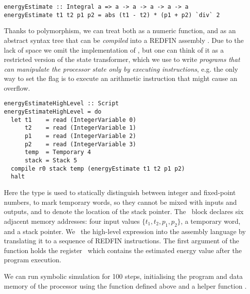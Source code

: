
\vspace{1mm}
\begin{verbatim}
energyEstimate :: Integral a => a -> a -> a -> a -> a
energyEstimate t1 t2 p1 p2 = abs (t1 - t2) * (p1 + p2) `div` 2
\end{verbatim}
\vspace{1mm}

\noindent
Thanks to polymorphism, we can treat  both as a numeric
function, and as an abstract syntax tree that can be \emph{compiled} into a
REDFIN assembly . Due to the lack of space we omit the implementation
of , but one can think of it as a restricted version
of the  state transformer, which we use to write \emph{programs that
can manipulate the processor state only by executing instructions}, e.g. the
only way to set the  flag is to execute an arithmetic instruction
that might cause an overflow.

\vspace{1mm}
\begin{verbatim}
energyEstimateHighLevel :: Script
energyEstimateHighLevel = do
  let t1    = read (IntegerVariable 0)
      t2    = read (IntegerVariable 1)
      p1    = read (IntegerVariable 2)
      p2    = read (IntegerVariable 3)
      temp  = Temporary 4
      stack = Stack 5
  compile r0 stack temp (energyEstimate t1 t2 p1 p2)
  halt
\end{verbatim}
\label{energyEstimateHighLevel}
\vspace{1mm}

Here the type  is used to statically distinguish between integer
and fixed-point numbers,  to mark temporary words, so they cannot
be mixed with inputs and outputs, and  to denote the location of the
stack pointer. The~ block declares six adjacent memory addresses: four
input values $\{t_1, t_2, p_1, p_2\}$, a temporary word, and a stack pointer.
We~ the high-level expression  into the assembly
language by translating it to a sequence of REDFIN instructions. The first
argument of the~ function holds the register~ which contains
the estimated energy value after the program execution.

We can run symbolic simulation for 100 steps, initialising the program and data
memory of the processor using the function  defined above and a
helper function .

